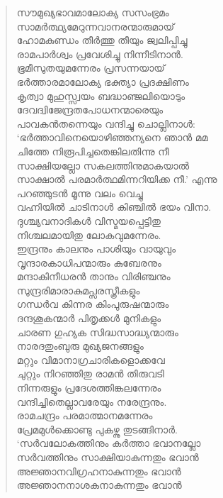 \begin{verse}
സൗമുഖ്യഭാവമാലോക്യ സസംഭ്രമം\\
സാമര്‍ത്ഥ്യമേറുന്നവാനരന്മാരുമായ്\\
ഹോമകുണ്ഡം തീര്‍ത്തു തീയും ജ്വലിപ്പിച്ചു\\
രാമപാര്‍ശ്വം പ്രവേശിച്ചു നിന്നീടിനാന്‍.\\
ഭൂമീസുതയുമന്നേരം പ്രസന്നയായ്\\
ഭര്‍ത്താരമാലോക്യ ഭക്ത്യാ പ്രദക്ഷിണം\\
കൃത്വാ മുഹുസ്സ്വയം ബദ്ധാഞ്ജലിയൊടും\\
ദേവദ്വിജേന്ദ്രതപോധനന്മാരെയും\\
പാവകന്‍തന്നെയും വന്ദിച്ചു ചൊല്ലിനാള്‍:\\
‘ഭര്‍ത്താവിനെയൊഴിഞ്ഞന്യനെ ഞാന്‍ മമ\\
ചിത്തേ നിരൂപിച്ചതെങ്കിലതിന്നു നീ\\
സാക്ഷിയല്ലോ സകലത്തിനുമാകയാല്‍\\
സാക്ഷാല്‍ പരമാര്‍ത്ഥമിന്നറിയിക്ക നീ.’ എന്നു\\
പറഞ്ഞുടന്‍ മൂന്നു വലം വെച്ചു\\
വഹ്നിയില്‍ ചാടിനാള്‍ കിഞ്ചില്‍ ഭയം വിനാ.\\
ദുശ്ച്യവനാദികള്‍ വിസ്മയപ്പെട്ടിതു\\
നിശ്ചലമായിതു ലോകവുമന്നേരം.\\
ഇന്ദ്രനും കാലനും പാശിയും വായുവും\\
വൃന്ദാരകാധിപന്മാരും കുബേരനും\\
മന്ദാകിനീധരന്‍ താനും വിരിഞ്ചനും\\
സുന്ദ്രരിമാരാകുമപ്സരസ്ത്രീകളും\\
ഗന്ധര്‍വ കിന്നര കിംപുരുഷന്മാരും\\
ദന്ദശൂകന്മാര്‍ പിതൃക്കള്‍ മുനികളും\\
ചാരണ ഗുഹ്യക സിദ്ധസാദ്ധ്യന്മാരും\\
നാരദതുംബുരു മുഖ്യജനങ്ങളും\\
മറ്റും വിമാനാഗ്രചാരികളൊക്കവേ\\
ചുറ്റും നിറഞ്ഞിതു രാമന്‍ തിരുവടി\\
നിന്നരുളും പ്രദേശത്തിങ്കലന്നേരം\\
വന്ദിച്ചിതെല്ലാവരേയും നരേന്ദ്രനും.\\
രാമചന്ദ്രം പരമാത്മാനമന്നേരം\\
പ്രേമമുള്‍ക്കൊണ്ടു പുകഴ്ന്നു തുടങ്ങിനാര്‍.\\
‘സര്‍വലോകത്തിനും കര്‍ത്താ ഭവാനല്ലോ\\
സര്‍വത്തിനും സാക്ഷിയാകുന്നതും ഭവാന്‍\\
അജ്ഞാനവിഗ്രഹനാകുന്നതും ഭവാന്‍\\
അജ്ഞാനനാശകനാകുന്നതും ഭവാന്‍\\

\end{verse}

